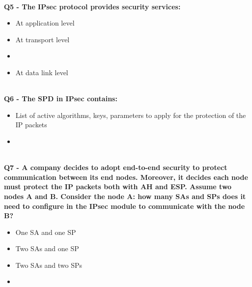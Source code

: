 \textbf{\\Q5 - The IPsec protocol provides security services:}
\begin{itemize}
	\item[A.] At application level
	\item[B.] At transport level
	\item[C.] 
	\item[D.] At data link level
\end{itemize}

\textbf{\\Q6 - The SPD in IPsec contains:}
\begin{itemize}
	\item[A.] List of active algorithms, keys, parameters to apply for the protection of the IP packets
	\item[B.] 
\end{itemize}

\textbf{\\Q7 - A company decides to adopt end-to-end security to protect communication between its end nodes. Moreover, it decides each node must protect the IP packets both with AH and ESP. Assume two nodes A and B. Consider the node A: how many SAs and SPs does it need to configure in the IPsec module to communicate with the node B?}
\begin{itemize}
	\item[A.] One SA and one SP
	\item[B.] Two SAs and one SP
	\item[C.] Two SAs and two SPs
	\item[D.] 
\end{itemize}

